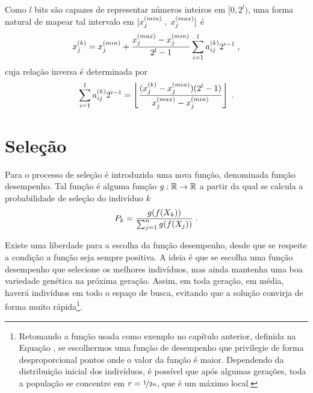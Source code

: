 Como $l$ bits são capazes de representar números inteiros em $ [0, 2^l) $,
uma forma natural de mapear tal intervalo
em $ [ x^{(min)}_{j} \; , \; x^{(max)}_{j} ] $ é
\begin{equation}
  x^{(k)}_j = x^{(min)}_{j} + \frac{x^{(max)}_{j} - x^{(min)}_{j}}{2^l - 1} \sum_{i = 1}^l {a}^{(k)}_{ij} 2^{i - 1} \;\mathrm{,}
\end{equation}
cuja relação inversa é determinada por
\begin{equation}
  \sum_{i = 1}^l {a}^{(k)}_{ij} 2^{i - 1} =
  \left\lfloor \frac{({x}^{(k)}_{j} - x^{(min)}_{j})(2^l - 1)}{x^{(max)}_{j} - x^{(min)}_{j}} \right\rfloor
  \;\mathrm{.}
\end{equation}

\section{Seleção}

Para o processo de seleção é introduzida uma nova função, denominada função desempenho.
Tal função é alguma função $ g : \mathbb{R} \rightarrow \mathbb{R} $ a partir da qual se calcula a probabilidade
de seleção do indivíduo $k$
\begin{equation}
  P_k = \frac{g(f(X_k))}{\sum_{j = 1}^n g(f(X_j))} \;\mathrm{.}
\end{equation}

Existe uma liberdade para a escolha da função desempenho, desde que se respeite a condição a
função seja sempre positiva. A ideia é que se escolha uma função desempenho que
selecione os melhores indivíduos, mas ainda mantenha uma boa variedade genética na
próxima geração. Assim, em toda geração, em média, haverá indivíduos em todo o espaço
de busca, evitando que a solução convirja de forma muito rápida\footnote{
  Retomando a função usada como exemplo no capítulo anterior, definida na Equação
  , se escolhermos uma função de desempenho que privilegie
  de forma desproporcional pontos onde o valor da função é maior. Dependendo da
  distribuição inicial dos indivíduos, é possível que após algumas gerações,
  toda a população se concentre em $ r = \nicefrac{1}{2n} $, que é um
  máximo local.
}.

\newcommand{\fmin}{f_{min}}
\newcommand{\fmax}{f_{max}}

